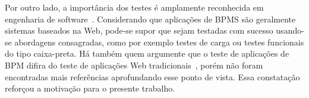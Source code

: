 \documentclass[12pt]{article}
\begin{document}

Por outro lado, a importância dos testes é amplamente reconhecida em engenharia de software~\cite{swebok14}.
Considerando que aplicações de BPMS são geralmente sistemas baseados na Web, pode-se supor que sejam testadas com sucesso usando-se abordagens consagradas, como por exemplo testes de carga ou testes funcionais do tipo caixa-preta. Há também quem argumente que o teste de aplicações de BPM difira do teste de aplicações Web tradicionais~\cite{evoke}, porém não foram encontradas mais referências aprofundando esse ponto de vista. Essa constatação reforçou a motivação para o presente trabalho.




\end{document}
